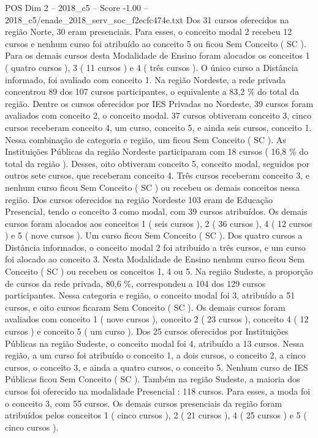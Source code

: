 \begin{textsample}{POS Dim 2 – 2018\_c5 – Score -1.00 – 2018\_c5/enade\_2018\_serv\_soc\_f2ecfc474e.txt}
Dos 31 cursos oferecidos na região Norte, 30 eram presenciais.
Para esses, o conceito modal 2 recebeu 12 cursos e nenhum curso foi atribuído ao conceito 5 ou ficou Sem Conceito ( SC ).
Para os demais cursos desta Modalidade de Ensino foram alocados os conceitos 1 ( quatro cursos ), 3 ( 11 cursos ) e 4 ( três cursos ).
O único curso a Distância informado, foi avaliado com conceito 1.
Na região Nordeste, a rede privada concentrou 89 dos 107 cursos participantes, o equivalente a 83,2 \% do total da região.
Dentre os cursos oferecidos por IES Privadas no Nordeste, 39 cursos foram avaliados com conceito 2, o conceito modal. 37 cursos obtiveram conceito 3, cinco cursos receberam conceito 4, um curso, conceito 5, e ainda seis cursos, conceito 1.
Nessa combinação de categoria e região, um ficou Sem Conceito ( SC ).
As Instituições Públicas da região Nordeste participaram com 18 cursos ( 16,8 \% do total da região ).
Desses, oito obtiveram conceito 5, conceito modal, seguidos por outros sete cursos, que receberam conceito 4.
Três cursos receberam conceito 3, e nenhum curso ficou Sem Conceito ( SC ) ou recebeu os demais conceitos nessa região.
Dos cursos oferecidos na região Nordeste 103 eram de Educação Presencial, tendo o conceito 3 como modal, com 39 cursos atribuídos.
Os demais cursos foram alocados aos conceitos 1 ( seis cursos ), 2 ( 36 cursos ), 4 ( 12 cursos ) e 5 ( nove cursos ).
Um curso ficou Sem Conceito ( SC ).
Dos quatro cursos a Distância informados, o conceito modal 2 foi atribuído a três cursos, e um curso foi alocado ao conceito 3.
Nesta Modalidade de Ensino nenhum curso ficou Sem Conceito ( SC ) ou recebeu os conceitos 1, 4 ou 5.
Na região Sudeste, a proporção de cursos da rede privada, 80,6 \%, correspondeu a 104 dos 129 cursos participantes.
Nessa categoria e região, o conceito modal foi 3, atribuído a 51 cursos, e oito cursos ficaram Sem Conceito ( SC ).
Os demais cursos foram avaliados com conceito 1 ( nove cursos ), conceito 2 ( 23 cursos ), conceito 4 ( 12 cursos ) e conceito 5 ( um curso ).
Dos 25 cursos oferecidos por Instituições Públicas na região Sudeste, o conceito modal foi 4, atribuído a 13 cursos.
Nessa região, a um curso foi atribuído o conceito 1, a dois cursos, o conceito 2, a cinco cursos, o conceito 3, e ainda a quatro cursos, o conceito 5.
Nenhum curso de IES Públicas ficou Sem Conceito ( SC ).
Também na região Sudeste, a maioria dos cursos foi oferecido na modalidade Presencial : 118 cursos.
Para esses, a moda foi o conceito 3, com 55 cursos.
Os demais cursos presenciais da região foram atribuídos pelos conceitos 1 ( cinco cursos ), 2 ( 21 cursos ), 4 ( 25 cursos ) e 5 ( cinco cursos ).

\end{textsample}
